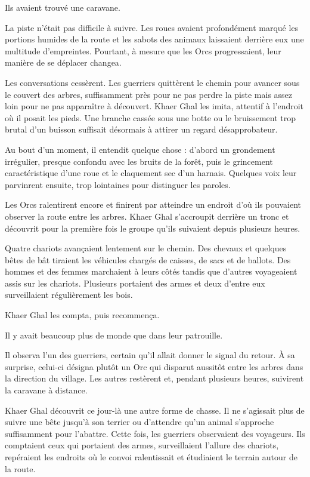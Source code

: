Ils avaient trouvé une caravane.

\scenebreak

La piste n'était pas difficile à suivre. Les roues avaient profondément marqué
les portions humides de la route et les sabots des animaux laissaient derrière
eux une multitude d'empreintes. Pourtant, à mesure que les Orcs progressaient,
leur manière de se déplacer changea.

Les conversations cessèrent. Les guerriers quittèrent le chemin pour avancer
sous le couvert des arbres, suffisamment près pour ne pas perdre la piste mais
assez loin pour ne pas apparaître à découvert. Khaer Ghal les imita, attentif
à l'endroit où il posait les pieds. Une branche cassée sous une botte ou le
bruissement trop brutal d'un buisson suffisait désormais à attirer un regard
désapprobateur.

Au bout d'un moment, il entendit quelque chose : d'abord un grondement
irrégulier, presque confondu avec les bruits de la forêt, puis le grincement
caractéristique d'une roue et le claquement sec d'un harnais. Quelques voix
leur parvinrent ensuite, trop lointaines pour distinguer les paroles.

Les Orcs ralentirent encore et finirent par atteindre un endroit d'où ils
pouvaient observer la route entre les arbres. Khaer Ghal s'accroupit derrière
un tronc et découvrit pour la première fois le groupe qu'ils suivaient depuis
plusieurs heures.

Quatre chariots avançaient lentement sur le chemin. Des chevaux et quelques
bêtes de bât tiraient les véhicules chargés de caisses, de sacs et de ballots.
Des hommes et des femmes marchaient à leurs côtés tandis que d'autres
voyageaient assis sur les chariots. Plusieurs portaient des armes et deux
d'entre eux surveillaient régulièrement les bois.

Khaer Ghal les compta, puis recommença.

Il y avait beaucoup plus de monde que dans leur patrouille.

Il observa l'un des guerriers, certain qu'il allait donner le signal du retour.
À sa surprise, celui-ci désigna plutôt un Orc qui disparut aussitôt entre les
arbres dans la direction du village. Les autres restèrent et, pendant plusieurs
heures, suivirent la caravane à distance.

Khaer Ghal découvrit ce jour-là une autre forme de chasse. Il ne s'agissait
plus de suivre une bête jusqu'à son terrier ou d'attendre qu'un animal
s'approche suffisamment pour l'abattre. Cette fois, les guerriers observaient
des voyageurs. Ils comptaient ceux qui portaient des armes, surveillaient
l'allure des chariots, repéraient les endroits où le convoi ralentissait et
étudiaient le terrain autour de la route.

